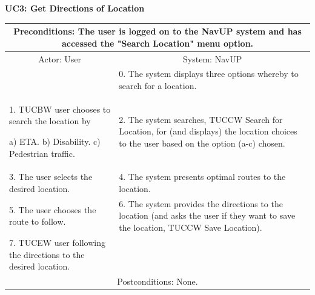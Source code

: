 ﻿\documentclass{article}
\begin{document}
		 \vspace{5mm}
         \begin{flushleft}
         \textbf{UC3: Get Directions of Location}\\
         \end{flushleft}
        	\centering		
       		 \small
       		 \begin{tabular}{|p{6cm}|p{6cm}|}
       		 \hline
       		 \multicolumn{2}{c}{ \parbox{12cm}{\vspace{2mm}Preconditions: The user is logged on to the NavUP system and has accessed the "Search Location" menu option.\vspace{2mm}}}\\
       		 \hline
       		 \multicolumn{1}{c}{Actor: User} & \multicolumn{1}{c}{ System: NavUP} \\
        		\hline
       		 & 0.	The system displays three options whereby to search for a location.\\
       		 \hline
       		 1.	TUCBW user chooses to search the location by 

						a)	ETA.
						b)	Disability.
						c)	Pedestrian traffic.
 				& 2.	The system searches, TUCCW Search for Location, for (and displays) the location choices to the user based on the option (a-c) chosen.\\
        		\hline
       		 3.	The user selects the desired location. & 4.	The system presents optimal routes to the location. \\
        		\hline
       		 5.	The user chooses the route to follow. & 6.	The system provides the directions to the location (and asks the user if they want to save the location, TUCCW Save Location).\\
        		\hline
        		7.	TUCEW user following the directions to the desired location. & \\
       		 \hline
        		\multicolumn{2}{c}{Postconditions: None.} \\
        		\hline
        \end{tabular} 
        
\end{document}
